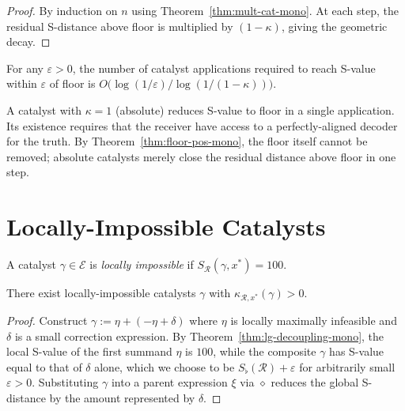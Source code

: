 \begin{proof}
By induction on $n$ using Theorem~\ref{thm:mult-cat-mono}.  At each step,
the residual S-distance above floor is multiplied by $(1 - \kappa)$, giving
the geometric decay.
\end{proof}

\begin{corollary}
For any $\varepsilon > 0$, the number of catalyst applications required to
reach S-value within $\varepsilon$ of floor is
$O\!\bigl(\log(1/\varepsilon) / \log(1/(1-\kappa))\bigr)$.
\end{corollary}

\begin{remark}
A catalyst with $\kappa = 1$ (absolute) reduces S-value to floor in a single
application.  Its existence requires that the receiver have access to a
perfectly-aligned decoder for the truth.  By Theorem~\ref{thm:floor-pos-mono},
the floor itself cannot be removed; absolute catalysts merely close the
residual distance above floor in one step.
\end{remark}

\section{Locally-Impossible Catalysts}
\label{sec:ch14-locallyimpossible}

\begin{definition}\label{def:loc-imp-mono}
A catalyst $\gamma \in \mathcal{E}$ is \emph{locally impossible} if
$S_{\mathcal{R}}(\gamma, x^{*}) = 100$.
\end{definition}

\begin{theorem}
\label{thm:loc-imp-mono}
There exist locally-impossible catalysts $\gamma$ with
$\kappa_{\mathcal{R}, x^{*}}(\gamma) > 0$.
\end{theorem}

\begin{proof}
Construct $\gamma := \eta + (-\eta + \delta)$ where $\eta$ is locally
maximally infeasible and $\delta$ is a small correction expression.  By
Theorem~\ref{thm:lg-decoupling-mono}, the local S-value of the first summand
$\eta$ is $100$, while the composite $\gamma$ has S-value equal to that of
$\delta$ alone, which we choose to be $S_{\flat}(\mathcal{R}) + \varepsilon$
for arbitrarily small $\varepsilon > 0$.  Substituting $\gamma$ into a parent
expression $\xi$ via $\diamond$ reduces the global S-distance by the amount
represented by $\delta$.
\end{proof}

